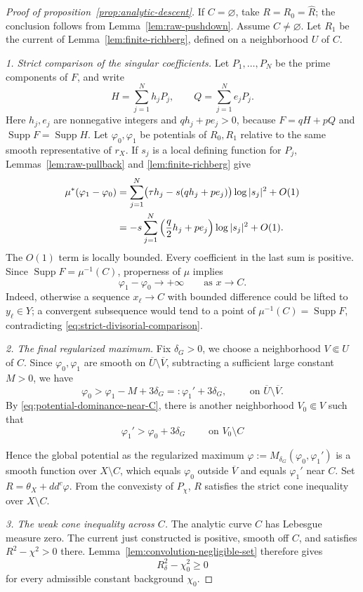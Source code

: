 \documentclass[reqno]{amsart}
\theoremstyle{remark}
\newcommand{\ddc}{dd^c}
\theoremstyle{plain}
\begin{document}
\begin{proof}[Proof of proposition~\ref{prop:analytic-descent}]
    If $C=\varnothing$, take $R=R_0=\widehat R$; the conclusion follows
from Lemma~\ref{lem:raw-pushdown}.  Assume $C\neq\varnothing$.
Let $R_1$ be the current of Lemma~\ref{lem:finite-richberg}, defined
on a neighborhood $U$ of $C$.

\smallskip
\noindent\emph{1. Strict comparison of the singular coefficients.}
Let $P_1,\ldots,P_N$ be the prime components of $F$, and write
\[
 H=\sum_{j=1}^Nh_jP_j,\qquad
 Q=\sum_{j=1}^Ne_jP_j.
\]
Here $h_j,e_j$ are nonnegative integers and
$qh_j+pe_j>0$, because $F=qH+pQ$ and
$\operatorname{Supp}F=\operatorname{Supp}H$.  Let
$\varphi_0,\varphi_1$ be potentials of $R_0,R_1$ relative to the
same smooth representative of $r_X$.  If $s_j$ is a local defining
function for $P_j$, Lemmas~\ref{lem:raw-pullback} and
\ref{lem:finite-richberg} give
\begin{align}
 \mu^*(\varphi_1-\varphi_0)
 &=
 \sum_{j=1}^N
 \bigl(\tau h_j-s(qh_j+pe_j)\bigr)\log|s_j|^2+O(1)
 \notag\\
 &=
 -s\sum_{j=1}^N
 \left(\frac q2h_j+pe_j\right)\log|s_j|^2+O(1).
 \label{eq:strict-divisorial-comparison}
\end{align}
The $O(1)$ term is locally bounded.  Every coefficient in the last
sum is positive.  Since $\operatorname{Supp}F=\mu^{-1}(C)$,
properness of $\mu$ implies
\begin{equation}\label{eq:potential-dominance-near-C}
 \varphi_1-\varphi_0\longrightarrow+\infty
 \qquad\text{as }x\longrightarrow C.
\end{equation}
Indeed, otherwise a sequence $x_\ell\to C$ with bounded difference
could be lifted to $y_\ell\in Y$; a convergent subsequence would tend
to a point of $\mu^{-1}(C)=\operatorname{Supp}F$, contradicting
\eqref{eq:strict-divisorial-comparison}.

\smallskip
\noindent\emph{2. The final regularized maximum.}
Fix $\delta_G>0$, we choose a neighborhood $V\Subset U$ of $C$. Since $\varphi_0,\varphi_1$ are smooth on $\overline{U}\setminus \overline{V} $, subtracting a sufficient large constant $M>0$, we have \[
\varphi_0>\varphi_1-M+3\delta_G=:\varphi_1'+3\delta_G, \qquad \text{ on } \overline{U}\setminus \overline{V} .
\] 
By \eqref{eq:potential-dominance-near-C}, there is another neighborhood $V_0\Subset V$ such that  \[
\varphi_1'>\varphi_0+3\delta_G \qquad \text{ on } V_0\setminus C
\]

Hence the global potential as the regularized maximum $
 \varphi:=M_{\delta_G}(\varphi_0,\varphi_1')$ is a smooth function over $X\setminus C$, which equals $\varphi_0$ outside $\overline{V}$ and equals $\varphi_1'$ near $C$. Set $R=\theta_X+\ddc \varphi$. From the convexisty of $P_\chi$, $R$ satisfies the strict cone inequality over $X\setminus C$. 

\smallskip
\noindent\emph{3. The weak cone inequality across $C$.}
The analytic curve $C$ has Lebesgue measure zero.  The current just
constructed is positive, smooth off $C$, and satisfies
$R^2-\chi^2>0$ there.  Lemma~\ref{lem:convolution-negligible-set}
therefore gives
\[
 R_\delta^2-\chi_0^2\geq0
\]
for every admissible constant background $\chi_0$. 
\end{proof}
\end{document}
